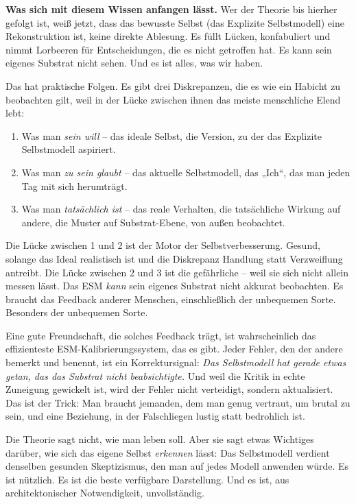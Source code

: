 \documentclass[11pt, twoside, openright]{book}
\begin{document}
\textbf{Was sich mit diesem Wissen anfangen lässt.} Wer der Theorie bis hierher gefolgt ist, weiß jetzt, dass das bewusste Selbst (das Explizite Selbstmodell) eine Rekonstruktion ist, keine direkte Ablesung. Es füllt Lücken, konfabuliert und nimmt Lorbeeren für Entscheidungen, die es nicht getroffen hat. Es kann sein eigenes Substrat nicht sehen. Und es ist alles, was wir haben.

Das hat praktische Folgen. Es gibt drei Diskrepanzen, die es wie ein Habicht zu beobachten gilt, weil in der Lücke zwischen ihnen das meiste menschliche Elend lebt:

\begin{enumerate}
  \item Was man \textit{sein will} -- das ideale Selbst, die Version, zu der das Explizite Selbstmodell aspiriert.
  \item Was man \textit{zu sein glaubt} -- das aktuelle Selbstmodell, das „Ich“, das man jeden Tag mit sich herumträgt.
  \item Was man \textit{tatsächlich ist} -- das reale Verhalten, die tatsächliche Wirkung auf andere, die Muster auf Substrat-Ebene, von außen beobachtet.
\end{enumerate}

Die Lücke zwischen 1 und 2 ist der Motor der Selbstverbesserung. Gesund, solange das Ideal realistisch ist und die Diskrepanz Handlung statt Verzweiflung antreibt. Die Lücke zwischen 2 und 3 ist die gefährliche -- weil sie sich nicht allein messen lässt. Das ESM \textit{kann} sein eigenes Substrat nicht akkurat beobachten. Es braucht das Feedback anderer Menschen, einschließlich der unbequemen Sorte. Besonders der unbequemen Sorte.

Eine gute Freundschaft, die solches Feedback trägt, ist wahrscheinlich das effizienteste ESM-Kalibrierungssystem, das es gibt. Jeder Fehler, den der andere bemerkt und benennt, ist ein Korrektursignal: \textit{Das Selbstmodell hat gerade etwas getan, das das Substrat nicht beabsichtigte.} Und weil die Kritik in echte Zuneigung gewickelt ist, wird der Fehler nicht verteidigt, sondern aktualisiert. Das ist der Trick: Man braucht jemanden, dem man genug vertraut, um brutal zu sein, und eine Beziehung, in der Falschliegen lustig statt bedrohlich ist.

Die Theorie sagt nicht, wie man leben soll. Aber sie sagt etwas Wichtiges darüber, wie sich das eigene Selbst \textit{erkennen} lässt: Das Selbstmodell verdient denselben gesunden Skeptizismus, den man auf jedes Modell anwenden würde. Es ist nützlich. Es ist die beste verfügbare Darstellung. Und es ist, aus architektonischer Notwendigkeit, unvollständig.
\end{document}
